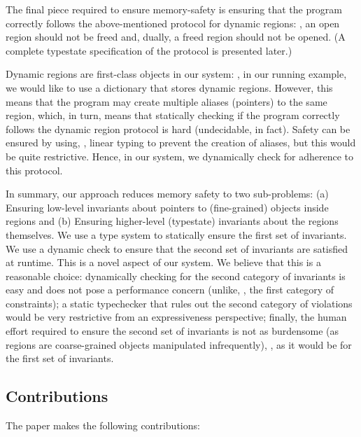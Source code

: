 The final piece required to ensure memory-safety is ensuring that the program correctly follows the above-mentioned
protocol for dynamic regions: \eg, an open region should not be freed and, dually, a freed region should not be opened.
(A complete typestate specification of the protocol is presented later.)

Dynamic regions are first-class objects in our system: \eg, in our running example,
we would like to use a dictionary that stores dynamic regions. However, this means that the program may create multiple
aliases (pointers) to the same region, which, in turn, means that statically checking if the program correctly follows the
dynamic region protocol is hard (undecidable, in fact). Safety can be ensured by using, \eg, linear typing to prevent the
creation of aliases, but this would be quite restrictive. Hence, in our system, we dynamically check for adherence to
this protocol.

In summary, our approach reduces memory safety to two sub-problems:
(a) Ensuring  low-level invariants about pointers to (fine-grained) objects inside regions and 
(b) Ensuring higher-level (typestate) invariants about the regions themselves. 
We use a type system to statically ensure the first set of invariants. We use a dynamic check to ensure that the
second set of invariants are satisfied at runtime.
%
This is a novel aspect of our system. We believe that this is a reasonable choice:
dynamically checking for the second category of invariants is easy and does not pose a performance concern (unlike, \eg, the first category of constraints);
a static typechecker that rules out the second category of violations would be very restrictive from an expressiveness perspective;
finally, the human effort required to ensure the second set of invariants is not as burdensome (as regions are coarse-grained objects
manipulated infrequently), \eg, as it would be for the first set of invariants.

\subsection*{Contributions}

The paper makes the following contributions:

